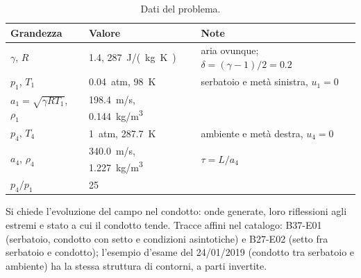 \documentclass[11pt,a4paper]{article}
\begin{document}
\begin{table}[H]
  \centering
  \begin{tabular}{lll}
    \toprule
    Grandezza & Valore & Note \\
    \midrule
    $\gamma$, $R$ & \num{1.4}, \SI{287}{J/(kg.K)} & aria ovunque; $\delta=(\gamma-1)/2=\num{0.2}$ \\
    $p_1$, $T_1$ & \SI{0.04}{atm}, \SI{98}{K} & serbatoio e metà sinistra, $u_1=0$ \\
    $a_1=\sqrt{\gamma RT_1}$, $\rho_1$ & \SI{198.4}{m/s}, \SI{0.144}{kg/m^3} & \\
    $p_4$, $T_4$ & \SI{1}{atm}, \SI{287.7}{K} & ambiente e metà destra, $u_4=0$ \\
    $a_4$, $\rho_4$ & \SI{340.0}{m/s}, \SI{1.227}{kg/m^3} & $\tau=L/a_4$ \\
    $p_4/p_1$ & \num{25} & \\
    \bottomrule
  \end{tabular}
  \caption{Dati del problema.}
\end{table}
Si chiede l'evoluzione del campo nel condotto: onde generate, loro riflessioni agli estremi e stato a cui il
condotto tende. Tracce affini nel catalogo: B37-E01 (serbatoio, condotto con setto e condizioni asintotiche) e
B27-E02 (setto fra serbatoio e condotto); l'esempio d'esame del 24/01/2019 (condotto tra serbatoio e ambiente)
ha la stessa struttura di contorni, a parti invertite.

\end{document}
